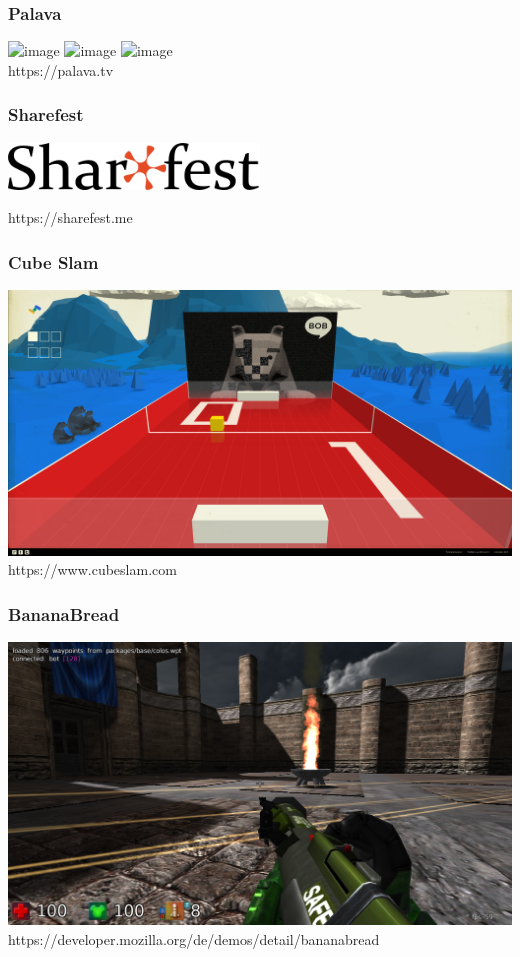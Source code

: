 \documentclass[12pt]{beamer}
\begin{document}
\begin{frame}
  \frametitle{Palava}
  \includegraphics<1>[height=0.7\textheight]{img/palava_1.jpg}
  \includegraphics<2>[height=0.7\textheight]{img/palava_2.jpg}
  \includegraphics<3>[height=0.7\textheight]{img/palava_3.jpg}
  \\ \hfill \tiny https://palava.tv
\end{frame}

\begin{frame}
  \frametitle{Sharefest}
  \centerline{\includegraphics[width=0.5\textwidth]{img/sharefest.png}}
  \centerline{\tiny https://sharefest.me}
\end{frame}

\begin{frame}
  \frametitle{Cube Slam}
  \includegraphics[height=0.7\textheight]{img/cube_slam.png} \\
  \hfill \tiny https://www.cubeslam.com
\end{frame}

\begin{frame}
  \frametitle{BananaBread}
  \includegraphics[height=0.7\textheight]{img/bananabread.png} \\
  \hfill \tiny https://developer.mozilla.org/de/demos/detail/bananabread
\end{frame}
\end{document}
